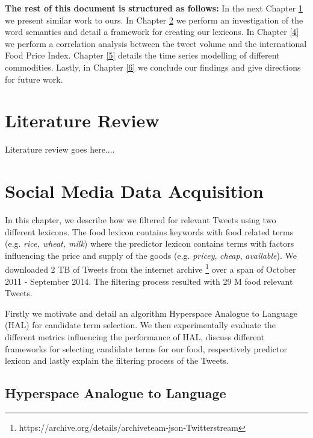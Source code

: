 \textbf{The rest of this document is structured as follows: } In the next Chapter \ref{2} we present similar work to ours. In Chapter \ref{3} we perform an investigation of the word semantics and detail a framework for creating our lexicons.  In Chapter \ref{4} we perform a correlation analysis between the tweet volume and the international Food Price Index. Chapter \ref{5} details the time series modelling of different commodities. Lastly, in Chapter \ref{6} we conclude our findings and give directions for future work. 





\chapter{Literature Review}
\label{2}

Literature review goes here....


\chapter{Social Media Data Acquisition}
\label{3}

In this chapter, we describe how we filtered for relevant Tweets using two different lexicons. The food lexicon contains keywords with food related terms  (e.g. \emph {rice, wheat, milk}) where the predictor lexicon contains terms with factors influencing the price and supply of the goods (e.g. \emph{pricey}, \emph {cheap}, \emph{available}). We downloaded 2 TB of Tweets from the internet archive \footnote{https://archive.org/details/archiveteam-json-Twitterstream}  over a span of October 2011 - September 2014.  The filtering process resulted with 29 M food relevant Tweets.

Firstly we motivate and detail an algorithm Hyperspace Analogue to Language (HAL)  \cite{lund96} for candidate term selection. We then  experimentally evaluate the  different metrics influencing the performance of HAL, discuss different frameworks for selecting candidate terms for our food, respectively predictor lexicon and lastly explain the filtering process of the Tweets. 



\section{Hyperspace Analogue to Language}

